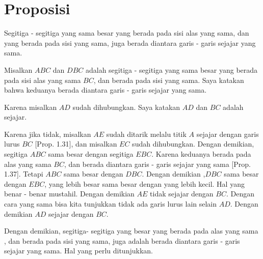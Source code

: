 \documentclass[a4paper]{book}
\begin{document}
\section*{\centering Proposisi \thesection} 
Segitiga - segitiga yang sama besar yang berada pada sisi alas yang sama,
dan yang berada pada sisi yang sama, juga berada diantara garis - garis sejajar
yang sama.
\begin{center}
\end{center}
Misalkan $ABC$ dan $DBC$ adalah segitiga - segitiga yang sama besar yang berada 
pada sisi alas yang sama $BC$, dan berada pada sisi yang sama. Saya katakan 
bahwa keduanya berada diantara garis - garis sejajar yang sama.

Karena misalkan $AD$ sudah dihubungkan. Saya katakan $AD$ dan $BC$ adalah 
sejajar.

Karena jika tidak, misalkan $AE$ sudah ditarik melalu titik $A$ sejajar dengan 
garis lurus $BC$ [Prop. 1.31], dan misalkan $EC$ sudah dihubungkan. Dengan 
demikian, segitiga $ABC$ sama besar dengan segitiga $EBC$. Karena keduanya
berada pada alas yang sama $BC$, dan berada diantara garis - garis sejajar
yang sama [Prop. 1.37]. Tetapi $ABC$ sama besar dengan $DBC$. Dengan demikian
,$DBC$ sama besar dengan $EBC$, yang lebih besar sama besar dengan yang lebih
kecil. Hal yang benar - benar mustahil. Dengan demikian $AE$ tidak sejajar 
dengan  $BC$. Dengan cara yang sama bisa kita tunjukkan tidak ada garis lurus
lain selain $AD$. Dengan demikian $AD$ sejajar dengan $BC$.

Dengan demikian, segitiga- segitiga yang besar yang berada pada alas yang sama , 
dan berada pada sisi yang sama, juga adalah berada diantara garis - garis sejajar
yang sama. Hal yang perlu ditunjukkan.

\end{document}
